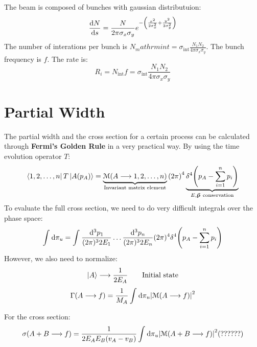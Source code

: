 \documentclass[../../main/main.tex]{subfiles}
\begin{document}
The beam is composed of bunches with gaussian distributuion:
\begin{equation}
    \dv{N}{s} = \frac{N}{2\pi \sigma_x \sigma_y} e^{-\qty(\frac{x^2}{2 \sigma_x^2} + \frac{y^2}{2 \sigma_y^2}) }
    \label{eq:}
\end{equation}
The number of interations per bunch is \( N_mathrm{int} = \sigma_\mathrm{int} \frac{N_1 N_2}{4\pi \sigma_x \sigma_y} \). The bunch frequency is \( f \). The rate is:
\begin{equation}
    R_i = N_\mathrm{int} f = \sigma_\mathrm{int} \frac{N_1 N_2}{4\pi \sigma_x \sigma_y}
    \label{eq:}
\end{equation}

\section{Partial Width}
The partial width and the cross section for a certain process can be calculated through \textbf{Fermi's Golden Rule} in a very practical way. By using the time evolution operator \( T \):
\begin{equation}
    \bra{1,2,\dots,n} T \ket{A(p_A)}
    =
    \underbrace{\mathcal{M}(A \longrightarrow 1,2,\dots,n)}_{\text{Invariant matrix element}} \qty(2\pi)^4 \underbrace{\delta^4 \qty(p_A - \sum_{i=1}^{n} p_i )}_{E, \va{p} \ \text{conservation}}
    \label{eq:}
\end{equation}
To evaluate the full cross section, we need to do very difficult integrals over the phase space:
\begin{equation}
    \int_{}^{} \mathrm{d}{\pi_{u}}
    =
    \int_{}^{} \frac{\mathrm{d}{^3 p_1}}{(2\pi)^3 2 E_1} \dots \frac{\mathrm{d}{^3 p_n}}{(2\pi)^3 2 E_n} (2\pi)^4 \delta^4 \qty(p_A - \sum_{i=1}^{n} p_i )
    \label{eq:}
\end{equation}
However, we also need to normalize:
\begin{equation}
    \ket{A} \longrightarrow \frac{1}{2 E_A} \qquad \text{Initial state}
    \label{eq:}
\end{equation}
\begin{equation}
    \Gamma(A \longrightarrow f)
    =
    \frac{1}{M_A} \int_{}^{} \mathrm{d}{\pi_u} \abs{\mathcal{M}(A \longrightarrow f)}^2
    \label{eq:}
\end{equation}

For the cross section:
\begin{equation}
    \sigma(A + B \longrightarrow f)
    =
    \frac{1}{2 E_A E_B (v_A - v_B)} \int_{}^{} \mathrm{d}{\pi_u} \abs{\mathcal{M}(A + B \longrightarrow f)}^2 (??????)
    \label{eq:}
\end{equation}
\end{document}
